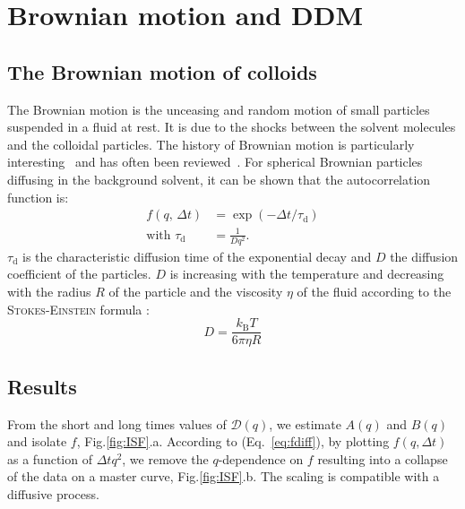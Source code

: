 \documentclass[prb,reprint,amsmath,amssymb]{revtex4-1}
\begin{document}
\section{Brownian motion and DDM}
\label{sec:BrownSection}

\subsection{The Brownian motion of colloids}
The Brownian motion is the unceasing and random motion of small particles suspended in a fluid at rest. It is due to the shocks between the solvent molecules and the colloidal particles. The history of Brownian motion is particularly interesting~\cite{13_brown1828brief,9_einstein1906theory, 14_sutherland1905lxxv, 10_von1906kinetischen,ajp1997lemons,22_perrin2014atomes} and has often been reviewed~\cite{ajp1997lemons,Nelson2004, ajp2006newburgh, ajp2006bergstein,Pearle2010}. For spherical Brownian particles  diffusing in the  background solvent, it can be shown that the autocorrelation function is\cite{18_sartor2003dynamic, ajp1999goldburg,ajp1969clark,8_berne2000dynamic}:
\begin{align}
f(q, \, \Delta t) &= \exp(-\Delta t/\tau_\text{d})
\label{eq:fdiff}\\
\text{with }\tau_\text{d} &= \frac{1}{Dq^2}.
\label{eq:relax}
\end{align}
$\tau_\text{d}$ is the characteristic diffusion time of the exponential decay and $D$ the diffusion coefficient of the particles. $D$ is increasing with the temperature and decreasing with the radius $R$ of the particle and the viscosity $\eta$ of the fluid according to the \textsc{Stokes-Einstein} formula \cite{Nelson2004, 16_CollSusp, ajp1997lemons, ajp2007jia}:
\begin{equation}
D = \frac{k_\text{B} T}{6 \pi \eta R}
\end{equation}

\subsection{Results}
\label{sec:resultcolloid}


From the short and long times values of $\mathcal{D}(q)$, we estimate $A(q)$ and $B(q)$ and isolate $f$, Fig.\ref{fig:ISF}.a. According to (Eq.~\ref{eq:fdiff}), by plotting $f(q, \Delta t)$ as a function of $\Delta t q^2$, we remove the $q$-dependence on $f$ resulting into a collapse of the data on a master curve, Fig.\ref{fig:ISF}.b. The scaling is compatible with a diffusive process.
\end{document}

